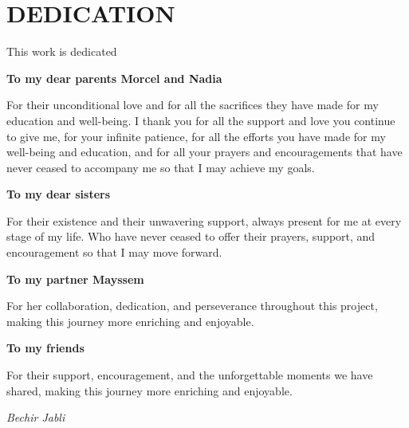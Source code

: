 ﻿\titlespacing*{\chapter}{0pt}{-2cm}{30pt}
\chapter*{DEDICATION}
\titlespacing*{\chapter}{0pt}{0pt}{50pt}
\thispagestyle{MyStyle}

\begin{center}
This work is dedicated
\end{center}

\begin{center}
\textbf{\large To my dear parents Morcel and Nadia}
\end{center}
\begin{center}
For their unconditional love and for all the sacrifices they have made for my education and well-being. I thank you for all the support and love you continue to give me, for your infinite patience, for all the efforts you have made for my well-being and education, and for all your prayers and encouragements that have never ceased to accompany me so that I may achieve my goals.
\end{center}

\begin{center}
\textbf{\large To my dear sisters}
\end{center}
\begin{center}
For their existence and their unwavering support, always present for me at every stage of my life. Who have never ceased to offer their prayers, support, and encouragement so that I may move forward.
\end{center}

\begin{center}
\textbf{\large To my partner Mayssem}
\end{center}
\begin{center}
For her collaboration, dedication, and perseverance throughout this project, making this journey more enriching and enjoyable.
\end{center}

\begin{center}
\textbf{\large To my friends}
\end{center}
\begin{center}
For their support, encouragement, and the unforgettable moments we have shared, making this journey more enriching and enjoyable.
\end{center}

\vspace{1.5cm}

\begin{flushright}
\textit{Bechir Jabli}
\end{flushright}
